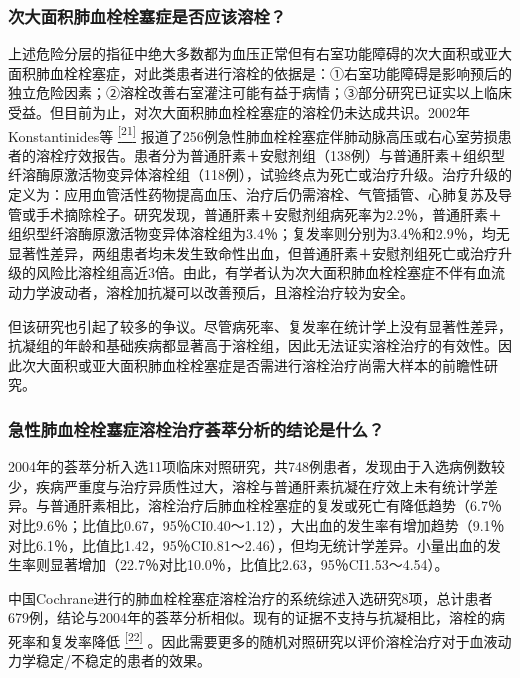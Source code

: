 \subsubsection{次大面积肺血栓栓塞症是否应该溶栓？}

上述危险分层的指征中绝大多数都为血压正常但有右室功能障碍的次大面积或亚大面积肺血栓栓塞症，对此类患者进行溶栓的依据是：①右室功能障碍是影响预后的独立危险因素；②溶栓改善右室灌注可能有益于病情；③部分研究已证实以上临床受益。但目前为止，对次大面积肺血栓栓塞症的溶栓仍未达成共识。2002年Konstantinides等
\protect\hyperlink{text00022.htmlux5cux23ch21-21}{\textsuperscript{{[}21{]}}}
报道了256例急性肺血栓栓塞症伴肺动脉高压或右心室劳损患者的溶栓疗效报告。患者分为普通肝素＋安慰剂组（138例）与普通肝素＋组织型纤溶酶原激活物变异体溶栓组（118例），试验终点为死亡或治疗升级。治疗升级的定义为：应用血管活性药物提高血压、治疗后仍需溶栓、气管插管、心肺复苏及导管或手术摘除栓子。研究发现，普通肝素＋安慰剂组病死率为2.2％，普通肝素＋组织型纤溶酶原激活物变异体溶栓组为3.4％；复发率则分别为3.4％和2.9％，均无显著性差异，两组患者均未发生致命性出血，但普通肝素＋安慰剂组死亡或治疗升级的风险比溶栓组高近3倍。由此，有学者认为次大面积肺血栓栓塞症不伴有血流动力学波动者，溶栓加抗凝可以改善预后，且溶栓治疗较为安全。

但该研究也引起了较多的争议。尽管病死率、复发率在统计学上没有显著性差异，抗凝组的年龄和基础疾病都显著高于溶栓组，因此无法证实溶栓治疗的有效性。因此次大面积或亚大面积肺血栓栓塞症是否需进行溶栓治疗尚需大样本的前瞻性研究。

\subsubsection{急性肺血栓栓塞症溶栓治疗荟萃分析的结论是什么？}

2004年的荟萃分析入选11项临床对照研究，共748例患者，发现由于入选病例数较少，疾病严重度与治疗异质性过大，溶栓与普通肝素抗凝在疗效上未有统计学差异。与普通肝素相比，溶栓治疗后肺血栓栓塞症的复发或死亡有降低趋势（6.7％对比9.6％；比值比0.67，95％CI0.40～1.12），大出血的发生率有增加趋势（9.1％对比6.1％，比值比1.42，95％CI0.81～2.46），但均无统计学差异。小量出血的发生率则显著增加（22.7％对比10.0％，比值比2.63，95％CI1.53～4.54）。

中国Cochrane进行的肺血栓栓塞症溶栓治疗的系统综述入选研究8项，总计患者679例，结论与2004年的荟萃分析相似。现有的证据不支持与抗凝相比，溶栓的病死率和复发率降低
\protect\hyperlink{text00022.htmlux5cux23ch22-21}{\textsuperscript{{[}22{]}}}
。因此需要更多的随机对照研究以评价溶栓治疗对于血液动力学稳定/不稳定的患者的效果。

